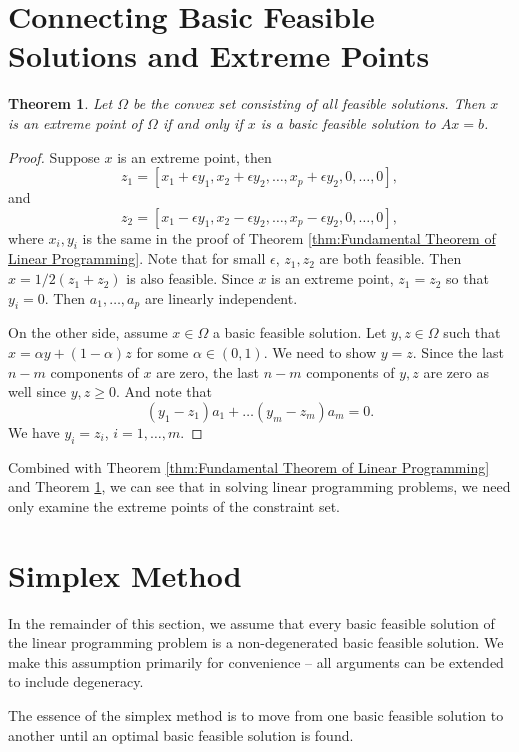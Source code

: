 \documentclass[12pt,a4paper]{report}
\numberwithin{equation}{section}
\theoremstyle{mystyle}
\newtheorem{theorem}[definition]{Theorem}
\begin{document}
	\section{Connecting Basic Feasible Solutions and Extreme Points}
	\begin{theorem}\label{thm:extreme point and bfs}
		Let $\Omega$ be the convex set consisting of all feasible solutions. Then $x$ is an extreme point of $\Omega$ if and only if $x$ is a basic feasible solution to $Ax=b$.
	\end{theorem}
	\begin{proof}
		Suppose $x$ is an extreme point, then
		$$
		z_1=[x_1+\epsilon y_1,x_2+\epsilon y_2,\dots,x_p+\epsilon y_2,0,\dots,0],
		$$
		and 
		$$
		z_2=[x_1-\epsilon y_1,x_2-\epsilon y_2,\dots,x_p-\epsilon y_2,0,\dots,0],
		$$
		where $x_i,y_i$ is the same in the proof of Theorem \ref{thm:Fundamental Theorem of Linear Programming}. Note that for small $\epsilon$, $z_1,z_2$ are both feasible. Then $x=1/2(z_1+z_2)$ is also feasible. Since $x$ is an extreme point, $z_1=z_2$ so that $y_i=0$. Then $a_1,\dots,a_p$ are linearly independent.
		
		On the other side, assume $x\in \Omega$ a basic feasible solution. Let $y,z\in \Omega$ such that $x=\alpha y+(1-\alpha)z$ for some $\alpha\in (0,1)$. We need to show $y=z$. Since the last $n-m$ components of $x$ are zero, the last $n-m$ components of $y,z$ are zero as well since $y,z\geq 0$. And note that
		$$
		(y_1-z_1)a_1+\dots (y_m-z_m)a_m=0.
		$$
		We have $y_i=z_i$, $i=1,\dots,m$.
	\end{proof}
	
	Combined with Theorem \ref{thm:Fundamental Theorem of Linear Programming} and Theorem \ref{thm:extreme point and bfs}, we can see that in solving linear programming problems, we need only examine the extreme points of the constraint set.
	
	\section{Simplex Method}
	In the remainder of this section, we assume that every basic feasible solution of the linear programming problem is a non-degenerated basic feasible solution. We make this assumption primarily for convenience -- all arguments can be extended to include degeneracy.
	
	The essence of the simplex method is to move from one basic feasible solution to another until an optimal basic feasible solution is found.
	
\end{document}
